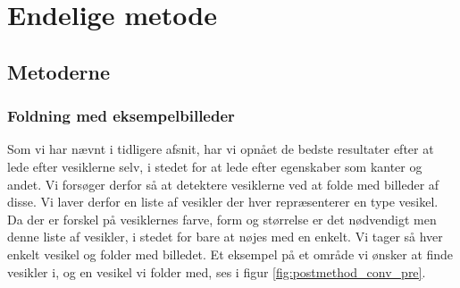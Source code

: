 \section{Endelige metode}
\subsection{Metoderne}
\subsubsection{Foldning med eksempelbilleder}
Som vi har nævnt i tidligere afsnit, har vi opnået de bedste resultater efter at lede efter vesiklerne selv, i stedet for at lede efter egenskaber som kanter og andet. Vi forsøger derfor så at detektere vesiklerne ved at folde med billeder af disse. Vi laver derfor en liste af vesikler der hver repræsenterer en type vesikel. Da der er forskel på vesiklernes farve, form og størrelse er det nødvendigt men denne liste af vesikler, i stedet for bare at nøjes med en enkelt. Vi tager så hver enkelt vesikel og folder med billedet. Et eksempel på et område vi ønsker at finde vesikler i, og en vesikel vi folder med, ses i figur \ref{fig:postmethod_conv_pre}.

